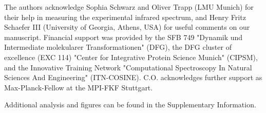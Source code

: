 \documentclass[journal=jpclcd,manuscript=article]{achemso}
\begin{document}
\begin{acknowledgement}

The authors acknowledge Sophia Schwarz and Oliver Trapp (LMU Munich) for their help in measuring the experimental infrared spectrum, and Henry Fritz Schaefer III (University of Georgia, Athens, USA) for useful comments on our manuscript.
%
%
Financial support was provided by the SFB 749  "{}Dynamik und Intermediate molekularer Transformationen"{} (DFG), the DFG cluster of excellence (EXC 114) "{}Center for Integrative Protein Science Munich"{} (CIPSM), and the Innovative Training Network "{}Computational Spectroscopy In Natural Sciences And Engineering"{} (ITN-COSINE). C.O. acknowledges further support as Max-Planck-Fellow at the MPI-FKF Stuttgart.

\end{acknowledgement}

\begin{suppinfo}

Additional analysis and figures can be found in the Supplementary Information.

\end{suppinfo}



\end{document}
